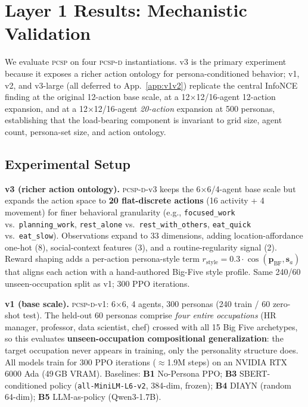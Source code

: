 \documentclass[conference]{IEEEtran}
\newcommand{\PCSP}{\textsc{pcsp}\xspace}
\newcommand{\PCSPD}{\textsc{pcsp-d}\xspace}
\begin{document}
\section{Layer 1 Results: Mechanistic Validation}
\label{sec:evidence}

We evaluate \PCSP on four \PCSPD{} instantiations. v3 is the primary
experiment because it exposes a richer action ontology for
persona-conditioned behavior; v1, v2, and v3-large (all deferred to
App.~\ref{app:v1v2}) replicate the central InfoNCE finding at the original
12-action base scale, at a 12$\times$12/16-agent 12-action expansion, and
at a 12$\times$12/16-agent \emph{20-action} expansion at 500 personas,
establishing that the load-bearing component is invariant to grid size,
agent count, persona-set size, and action ontology.

\subsection{Experimental Setup}

\textbf{v3 (richer action ontology).}
\PCSPD-v3 keeps the 6$\times$6/4-agent base scale but expands the action
space to \textbf{20 flat-discrete actions} (16 activity + 4 movement) for
finer behavioral granularity (e.g., \texttt{focused\_work} vs.\
\texttt{planning\_work}, \texttt{rest\_alone} vs.\ \texttt{rest\_with\_others},
\texttt{eat\_quick} vs.\ \texttt{eat\_slow}).
Observations expand to 33 dimensions, adding location-affordance one-hot
(8), social-context features (3), and a routine-regularity signal (2).
Reward shaping adds a per-action persona-style term
$r_{\text{style}} = 0.3 \cdot \cos(\mathbf{p}_{\text{BF}}, \mathbf{s}_a)$
that aligns each action with a hand-authored Big-Five style profile.
Same 240/60 unseen-occupation split as v1; 300 PPO iterations.

\textbf{v1 (base scale).}
\PCSPD-v1: 6$\times$6, 4 agents, 300 personas (240 train / 60 zero-shot test).
The held-out 60 personas comprise \emph{four entire occupations} (HR manager,
professor, data scientist, chef) crossed with all 15 Big Five archetypes, so
this evaluates \textbf{unseen-occupation compositional generalization}: the
target occupation never appears in training, only the personality structure
does.
All models train for 300 PPO iterations ($\approx$1.9M steps) on an NVIDIA
RTX 6000 Ada (49\,GB VRAM).
Baselines: \textbf{B1} No-Persona PPO; \textbf{B3} SBERT-conditioned policy
(\texttt{all-MiniLM-L6-v2}, 384-dim, frozen); \textbf{B4} DIAYN (random 64-dim);
\textbf{B5} LLM-as-policy (Qwen3-1.7B).
\end{document}
